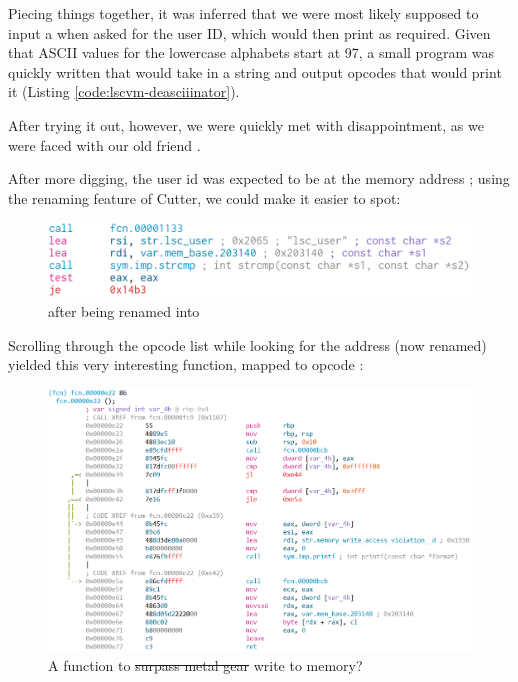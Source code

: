 		Piecing things together, it was inferred that we were most likely supposed to input a  when asked for the user ID,
		which would then print  as required. Given that ASCII values for the lowercase alphabets start at 97, a small
		program was quickly written that would take in a string and output opcodes that would print it (Listing \ref{code:lscvm-deasciiinator}).

		After trying it out, however, we were quickly met with disappointment, as we were faced with our old friend .

		\pagebreak
		After more digging, the user id was expected to be at the memory address ; using the renaming feature of Cutter, we could
		make it easier to spot:

		\begin{figure}[!htbp]\centering
			\includegraphics[width=150mm]{figures/lscvm-ii/addr-after-rename.png} \vspace{5mm}
			\caption{\ttt{[0x203140]} after being renamed into }
		\end{figure}

		Scrolling through the opcode list while looking for the address (now renamed) yielded this very interesting function, mapped to opcode
		:

		\begin{figure}[!htbp]\centering
			\includegraphics[width=150mm]{figures/lscvm-ii/write-to-memory.png} \vspace{5mm}
			\caption{A function to \sout{surpass metal gear} write to memory?}
		\end{figure}

